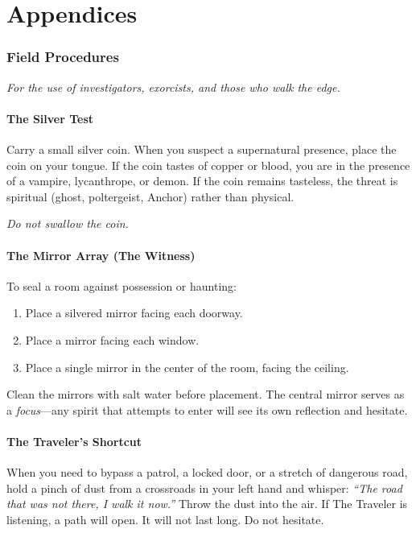 \appendix
\part{Appendices}

\section{Field Procedures}

\emph{For the use of investigators, exorcists, and those who walk the edge.}

\subsection{The Silver Test}

Carry a small silver coin. When you suspect a supernatural presence, place the coin on your tongue. If the coin tastes of copper or blood, you are in the presence of a vampire, lycanthrope, or demon. If the coin remains tasteless, the threat is spiritual (ghost, poltergeist, Anchor) rather than physical.

\emph{Do not swallow the coin.}

\subsection{The Mirror Array (The Witness)}

To seal a room against possession or haunting:
\begin{enumerate}
  \item Place a silvered mirror facing each doorway.
  \item Place a mirror facing each window.
  \item Place a single mirror in the center of the room, facing the ceiling.
\end{enumerate}
Clean the mirrors with salt water before placement. The central mirror serves as a \emph{focus}---any spirit that attempts to enter will see its own reflection and hesitate.

\subsection{The Traveler's Shortcut}

When you need to bypass a patrol, a locked door, or a stretch of dangerous road, hold a pinch of dust from a crossroads in your left hand and whisper: \emph{``The road that was not there, I walk it now.''} Throw the dust into the air. If The Traveler is listening, a path will open. It will not last long. Do not hesitate.

